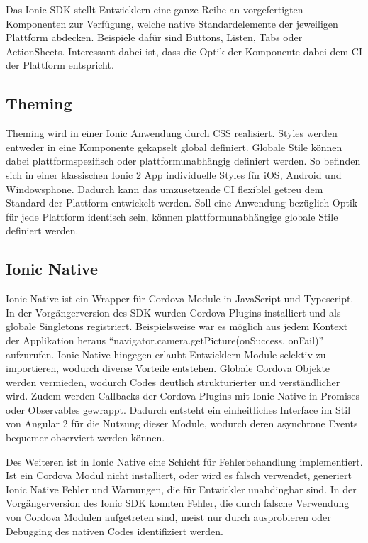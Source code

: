 Das Ionic \ac{SDK} stellt Entwicklern eine ganze Reihe an vorgefertigten Komponenten zur Verfügung,
welche native Standardelemente der jeweiligen Plattform abdecken. Beispiele dafür sind Buttons, Listen, Tabs oder ActionSheets.
Interessant dabei ist, dass die Optik der Komponente dabei dem \ac{CI} der Plattform entspricht.
\cite{ionic99:online}

\subsection{Theming}
Theming wird in einer Ionic Anwendung durch \ac{CSS} realisiert.
Styles werden entweder in eine Komponente gekapselt global definiert.
Globale Stile können dabei plattformspezifisch oder plattformunabhängig definiert werden.
So befinden sich in einer klassischen Ionic 2 App individuelle Styles für iOS, Android und Windowsphone.
Dadurch kann das umzusetzende \ac{CI} flexiblel getreu dem Standard der Plattform entwickelt werden.
Soll eine Anwendung bezüglich Optik für jede Plattform identisch sein,
können plattformunabhängige globale Stile definiert werden.
\cite{ionic73:online}


\subsection{Ionic Native}

Ionic Native ist ein Wrapper für Cordova Module in JavaScript und Typescript.
In der Vorgängerversion des \ac{SDK} wurden Cordova Plugins installiert und als globale Singletons registriert.
Beispielsweise war es möglich aus jedem Kontext der Applikation heraus ``navigator.camera.getPicture(onSuccess, onFail)'' aufzurufen.
Ionic Native hingegen erlaubt Entwicklern Module selektiv zu importieren, wodurch diverse Vorteile entstehen.
Globale Cordova Objekte werden vermieden, wodurch Codes deutlich strukturierter und verständlicher wird.
Zudem werden Callbacks der Cordova Plugins mit Ionic Native in Promises oder Observables gewrappt.
Dadurch entsteht ein einheitliches Interface im Stil von Angular 2 für die Nutzung dieser Module,
wodurch deren asynchrone Events bequemer observiert werden können.

Des Weiteren ist in Ionic Native eine Schicht für Fehlerbehandlung implementiert.
Ist ein Cordova Modul nicht installiert, oder wird es falsch verwendet,
generiert Ionic Native Fehler und Warnungen, die für Entwickler unabdingbar sind.
In der Vorgängerversion des Ionic \ac{SDK} konnten Fehler, die durch falsche Verwendung von
Cordova Modulen aufgetreten sind, meist nur durch ausprobieren oder Debugging des nativen Codes identifiziert werden.
\cite{ionic55:online}

